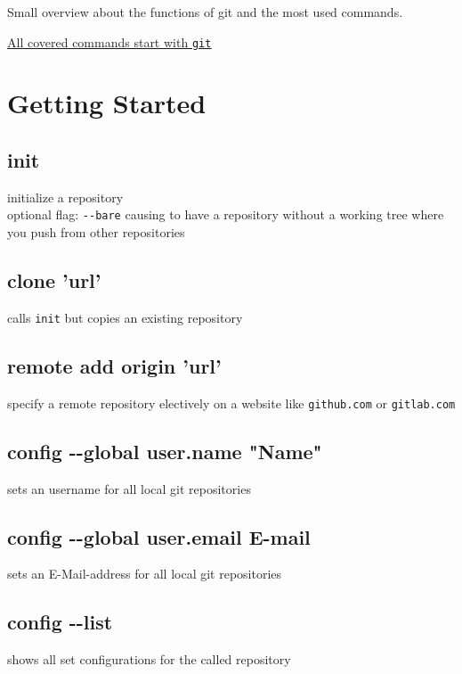 Small overview about the functions of git and the most used commands.
\begin{center}
	\underline{\underline{All covered commands start with \texttt{git}}}\\
\end{center}

\section*{Getting Started}


\subsection*{init} 
initialize a repository\\
optional flag: \texttt{-{}-bare} causing to have 
a repository without a working tree where you push from other repositories \\ 

\subsection*{clone 'url'}
calls \texttt{init} but copies an existing repository\\

\subsection*{remote add origin 'url'}
specify a remote repository electively on a website like \texttt{github.com} or \texttt{gitlab.com}\\

\subsection*{config -{}-global user.name "Name"}
sets an username for all local git repositories\\

\subsection*{config -{}-global user.email E-mail}
sets an E-Mail-address for all local git repositories\\

\subsection*{config -{}-list}
shows all set configurations for the called repository \\



